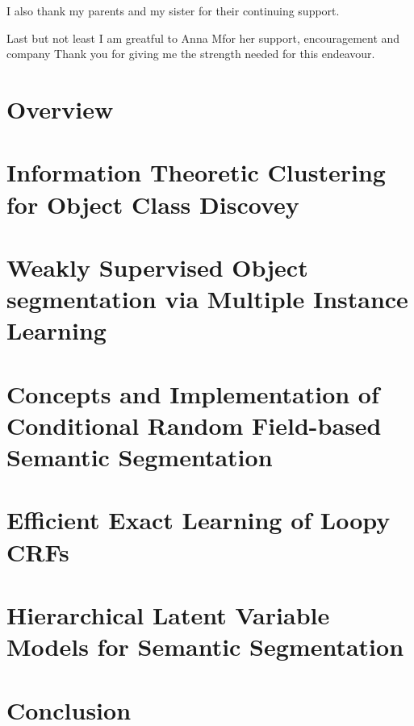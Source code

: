 \documentclass[12pt,toc=bibnumbered, a4paper,twoside]{scrbook}
\begin{document}
I also thank my parents and my sister for their continuing support.

Last but not least I am greatful to Anna M\uller for her support, encouragement and company
Thank you for giving me the strength needed for this endeavour.


\chapter{Overview}


\chapter{Information Theoretic Clustering for Object Class Discovey}


\chapter{Weakly Supervised Object segmentation via Multiple Instance Learning}



\chapter{Concepts and Implementation of Conditional Random Field-based Semantic Segmentation}\label{structured_pystruct}



\chapter{Efficient Exact Learning of Loopy CRFs}



\chapter{Hierarchical Latent Variable Models for Semantic Segmentation}

\chapter{Conclusion}




\end{document}
